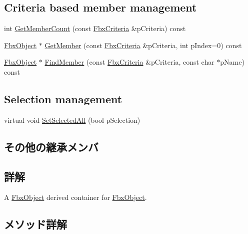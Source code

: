 \subsection*{Criteria based member management}
\begin{DoxyCompactItemize}
\item 
int \hyperlink{class_fbx_collection_ab885c6a1cc7eb77b471ae11c65658258}{Get\+Member\+Count} (const \hyperlink{class_fbx_criteria}{Fbx\+Criteria} \&p\+Criteria) const
\item 
\hyperlink{class_fbx_object}{Fbx\+Object} $\ast$ \hyperlink{class_fbx_collection_a0734fa6462dbc0926b610dfc6047252e}{Get\+Member} (const \hyperlink{class_fbx_criteria}{Fbx\+Criteria} \&p\+Criteria, int p\+Index=0) const
\item 
\hyperlink{class_fbx_object}{Fbx\+Object} $\ast$ \hyperlink{class_fbx_collection_a72875fa801308b233f5e1cb04cf66bb4}{Find\+Member} (const \hyperlink{class_fbx_criteria}{Fbx\+Criteria} \&p\+Criteria, const char $\ast$p\+Name) const
\end{DoxyCompactItemize}
\subsection*{Selection management}
\begin{DoxyCompactItemize}
\item 
virtual void \hyperlink{class_fbx_collection_a93caba5f2a0bded8cb00fca4001950e9}{Set\+Selected\+All} (bool p\+Selection)
\end{DoxyCompactItemize}
\subsection*{その他の継承メンバ}


\subsection{詳解}
A \hyperlink{class_fbx_object}{Fbx\+Object} derived container for \hyperlink{class_fbx_object}{Fbx\+Object}. 

\subsection{メソッド詳解}
\mbox{\label{class_fbx_collection_a8f9bfa57454dda20ef75dd4f27761a15}} 

